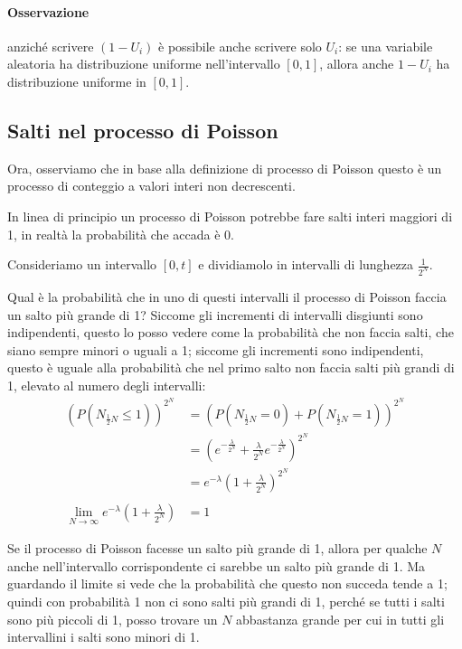 \documentclass[a4paper,12pt]{book}
\begin{document}
\paragraph{Osservazione}anziché scrivere $ (1 - U_i) $ è possibile anche scrivere solo $ U_i $: se una variabile aleatoria ha distribuzione uniforme nell'intervallo $ [0,1] $, allora anche $ 1 - U_i $ ha distribuzione uniforme in $ [0,1] $.

\subsection{Salti nel processo di Poisson}

Ora, osserviamo che in base alla definizione di processo di Poisson questo è un processo di conteggio a valori interi non decrescenti.

In linea di principio un processo di Poisson potrebbe fare salti interi maggiori di 1, in realtà la probabilità che accada è 0. 

Consideriamo un intervallo $ [0,t] $ e dividiamolo in intervalli di lunghezza $\frac{1}{2^N}$.



Qual è la probabilità che in uno di questi intervalli il processo di Poisson faccia un salto più grande di 1? Siccome gli incrementi di intervalli disgiunti sono indipendenti, questo lo posso vedere come la probabilità che non faccia salti, che siano sempre minori o uguali a 1; siccome gli incrementi sono indipendenti, questo è uguale alla probabilità che nel primo salto non faccia salti più grandi di 1, elevato al numero degli intervalli:
\begin{align*}
	(P(N_{\frac{1}{2}N} \le 1))^{2^N} & = (P(N_{\frac{1}{2}N} = 0) + P(N_{\frac{1}{2}N} = 1) )^{2^N} \\
	& = ( e^{-\frac{\lambda}{2^N}} + \frac{\lambda}{2^N}e^{-\frac{\lambda}{2^N}}  )^{2^N} \\
	& = e^{-\lambda}(1 + \frac{\lambda}{2^N})^{2^N} \\
	\\
	\lim\limits_{N \to \infty} e^{-\lambda}(1 + \frac{\lambda}{2^N}) & = 1
\end{align*}

Se il processo di Poisson facesse un salto più grande di 1, allora per qualche $ N $ anche nell'intervallo corrispondente ci sarebbe un salto più grande di 1. Ma guardando il limite si vede che la probabilità che questo non succeda tende a 1; quindi con probabilità 1 non ci sono salti più grandi di 1, perché se tutti i salti sono più piccoli di 1, posso trovare un $ N $ abbastanza grande per cui in tutti gli intervallini i salti sono minori di 1. 
\end{document}
